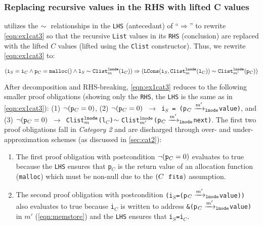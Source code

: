 \subsubsection{Replacing \SpecL{} recursive values in the RHS with lifted C values}
\toolName{} utilizes
the $\sim{}$ relationships in the {\tt LHS} (antecedant) of ``$\Rightarrow$''
to rewrite \cref{eqn:ex1cat3}
so that the recursive {\tt List} values in its {\tt RHS} (conclusion)
are replaced with the lifted $C$ values (lifted using
the {\tt Clist} constructor). Thus, we
rewrite \cref{eqn:ex1cat3} to:
\vspace{-5px}
\begin{small}
\begin{equation}\label{eqn:ex2cat3}
({\tt i}_S={\tt i}_C \land {\tt p}_C={\tt malloc()} \land {\tt l}_S \sim{} {\tt Clist}_m^{{\tt lnode}}({\tt l}_C)) \Rightarrow ({\tt LCons}({\tt i}_S, {\tt Clist}_m^{{\tt lnode}}({\tt l}_C)) \sim{} {\tt Clist}_{m'}^{{\tt lnode}}({\tt p}_C))
\end{equation}
\end{small}
After decomposition and RHS-breaking, \cref{eqn:ex1cat3}
reduces to the following smaller proof obligations (showing only the
{\tt RHS}, the {\tt LHS} is the same as in \cref{eqn:ex1cat3}):
(1) $\neg({\tt p}_C=0)$,
(2) {\tt $\neg({\tt p}_C=0)$ $\rightarrow$ i$_S$\ =\ (p$_C\xrightarrow[]{m'}_{\mathrm{\tt lnode}}$value)}, and
(3) {\tt $\neg({\tt p}_C=0)$ $\rightarrow$ Clist$_{m}^{{\tt lnode}}$(l$_C$)$\sim{}$Clist$_{m'}^{{\tt lnode}}$(p$_C\xrightarrow[]{m'}_{\mathrm{\tt lnode}}$next)}.
The first two proof obligations fall in {\em Category 2} and
are discharged through over- and under-approximation schemes (as discussed
in \cref{sec:cat2}):
\begin{enumerate}
\item The first proof obligation with
postcondition $\neg({\tt p}_C=0)$
evaluates to true because the {\tt LHS} ensures that {\tt p$_C$} is the
return value of an allocation function ({\tt malloc}) which must be
non-null due to the $(C\ \  \mathrm{\tt fits})$ assumption.
\item The second proof obligation with
postcondition {\tt (i$_S$=(p$_C\xrightarrow[]{m'}_{\mathrm{\tt lnode}}$value))}
also evaluates to true because {\tt i$_C$} is written to address {\tt \&(p$_C\xrightarrow[]{m'}_{\mathrm{\tt lnode}}$value)}
in $m'$ (\cref{eqn:memstore}) and the {\tt LHS} ensures that {\tt i$_S$=i$_C$}.
\end{enumerate}


